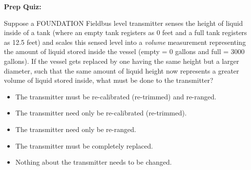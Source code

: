 \vfil \eject

\noindent
{\bf Prep Quiz:}

Suppose a FOUNDATION Fieldbus level transmitter senses the height of liquid inside of a tank (where an empty tank registers as 0 feet and a full tank registers as 12.5 feet) and scales this sensed level into a {\it volume} measurement representing the amount of liquid stored inside the vessel (empty = 0 gallons and full = 3000 gallons).  If the vessel gets replaced by one having the same height but a larger diameter, such that the same amount of liquid height now represents a greater volume of liquid stored inside, what must be done to the transmitter?

\begin{itemize}
\item{} The transmitter must be re-calibrated (re-trimmed) and re-ranged.
\vskip 5pt 
\item{} The transmitter need only be re-calibrated (re-trimmed).
\vskip 5pt 
\item{} The transmitter need only be re-ranged.
\vskip 5pt 
\item{} The transmitter must be completely replaced.
\vskip 5pt 
\item{} Nothing about the transmitter needs to be changed.
\end{itemize}



